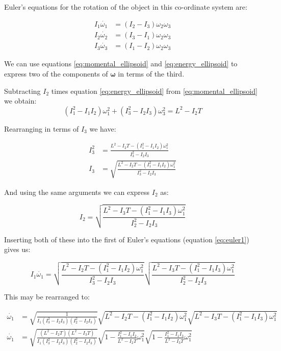 \documentclass[a4paper, 12pt]{article}
\begin{document}
Euler's equations for the rotation of the object in this co-ordinate system are:

\begin{align}
  I_1\dot{\omega_1}& =(I_2 - I_3)\omega_2\omega_3 \label{eq:euler1} \\
  I_2\dot{\omega_2}& =(I_3 - I_1)\omega_2\omega_3 \\
  I_3\dot{\omega_3}& =(I_1 - I_2)\omega_2\omega_3 
\end{align}

We can use equations \ref{eq:momental_ellipsoid} and \ref{eq:energy_ellipsoid} to express two of the components of $\boldsymbol{\omega}$ in terms of the third.

Subtracting $I_2$ times equation \ref{eq:energy_ellipsoid} from \ref{eq:momental_ellipsoid} we obtain:
\begin{equation}
  (I_1^2 - I_1I_2)\omega_1^2 + (I_3^2 - I_2I_3)\omega_3^2 = L^2 - I_2T
\end{equation}

Rearranging in terms of $I_3$ we have:

\begin{align}
  I_3^2 &=\frac{L^2 - I_2T - (I_1^2 - I_1I_2)\omega_1^2}{I_3^2 - I_2I_3} \\
  I_3 &=\sqrt{\frac{L^2 - I_2T - (I_1^2 - I_1I_2)\omega_1^2}{I_3^2 - I_2I_3}}
\end{align}

And using the same arguments we can express $I_2$ as:

\begin{equation}
  I_2 =\sqrt{\frac{L^2 - I_3T - (I_1^2 - I_1I_3)\omega_1^2}{I_2^2 - I_2I_3}}
\end{equation}


Inserting both of these into the first of Euler's equations (equation \ref{eq:euler1}) gives us:

\begin{equation}
  I_1\dot{\omega_1} = \sqrt{\frac{L^2 - I_2T - (I_1^2 - I_1I_2)\omega_1^2}{I_3^2 - I_2I_3}}\sqrt{\frac{L^2 - I_3T - (I_1^2 - I_1I_3)\omega_1^2}{I_2^2 - I_2I_3}}
\end{equation}

This may be rearranged to:

  \begin{align}
    \dot{\omega_1} &= \sqrt{\frac{1}{I_1(I_3^2 - I_2I_3)(I_2^2 - I_2I_3)}}\sqrt{L^2 - I_2T - (I_1^2 - I_1I_2)\omega_1^2}\sqrt{L^2 - I_3T - (I_1^2 - I_1I_3)\omega_1^2} \\
    \dot{\omega_1} &= \sqrt{\frac{(L^2 - I_2T)(L^2 - I_3T)}{I_1(I_3^2 - I_2I_3)(I_2^2 - I_2I_3)}}\sqrt{ 1 - \frac{I_1^2 - I_1I_2}{L^2 - I_2T}\omega_1^2}\sqrt{ 1 - \frac{I_1^2 - I_1I_3}{L^2 - I_3T}\omega_1^2}\label{eq:fullode}
  \end{align}
\end{document}
